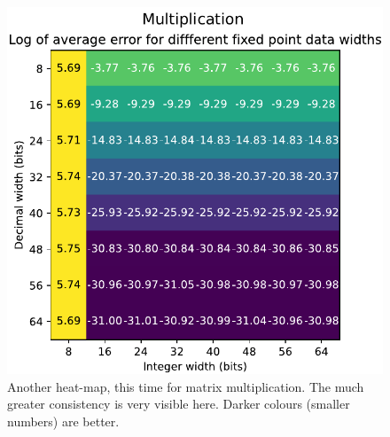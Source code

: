 \documentclass[12pt]{article}
\begin{document}
\begin{figure}[thp]
	\centering
	
	\includegraphics[width=\textwidth]{heatmap_full_mul.pdf}
	
	\caption{Another heat-map, this time for matrix multiplication. The much greater consistency is very visible here. Darker colours (smaller numbers) are better.}
	\label{full_heat_mul}
\end{figure}
\end{document}
